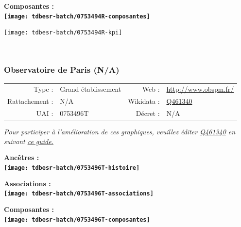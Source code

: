 \documentclass[12pt,french,]{article}
\begin{document}
\begin{center} \bf Composantes : \\  
\texttt{[image: tdbesr-batch/0753494R-composantes]} \end{center}

\begin{center}\texttt{[image: tdbesr-batch/0753494R-kpi]} \end{center}\checkoddpage

\ifoddpage ~\newpage \fi   

\hypertarget{observatoire-de-paris-na}{%
\subsubsection{Observatoire de Paris
(N/A)}\label{observatoire-de-paris-na}}

\begin{tabular*}{\textwidth}{rp{5cm}rl}  
\hline  
Type : & Grand établissement & Web : &\href{http://www.obspm.fr/}{http://www.obspm.fr/} \\  
Rattachement : & N/A & Wikidata : & \href{https://www.wikidata.org/entity/Q461340}{Q461340} \\  
UAI : & 0753496T & Décret : & N/A \\  
\hline  
\end{tabular*}

\textit{\scriptsize Pour participer à l'amélioration de ces graphiques, veuillez éditer  \href{https://www.wikidata.org/entity/Q461340}{Q461340}  en suivant \href{https://github.com/cpesr/wikidataESR/blob/master/Rmd/wikidataESR.md}{ce guide.}}

\vspace{1cm}  
\begin{minipage}[b]{0.50\textwidth}\begin{center} \bf Ancêtres : \\  
\texttt{[image: tdbesr-batch/0753496T-histoire]} \end{center}\end{minipage}\begin{minipage}[b]{0.50\textwidth}\begin{center} \bf Associations : \\  
\texttt{[image: tdbesr-batch/0753496T-associations]} \end{center}\end{minipage}

\hrulefill

\begin{center} \bf Composantes : \\  
\texttt{[image: tdbesr-batch/0753496T-composantes]} \end{center}
\end{document}
